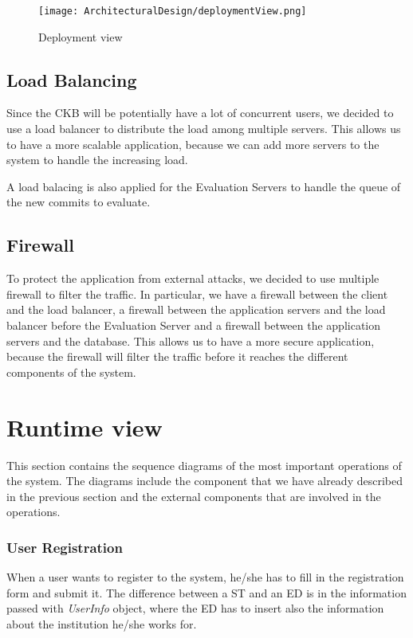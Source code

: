 \begin{figure}[H]
    \label{fig:deployment-view}
    \centering
    \texttt{[image: ArchitecturalDesign/deploymentView.png]}
    \caption{Deployment view}
\end{figure}


\subsection{Load Balancing}
Since the CKB will be potentially have a lot of concurrent users, we decided to use a load balancer to distribute the load among multiple servers. This allows us to have a more scalable application, because we can add more servers to the system to handle the increasing load.

A load balacing is also applied for the Evaluation Servers to handle the queue of the new commits to evaluate.

\subsection{Firewall}
To protect the application from external attacks, we decided to use multiple firewall to filter the traffic. In particular, we have a firewall between the client and the load balancer, a firewall between the application servers and the load balancer before the Evaluation Server and a firewall between the application servers and the database. This allows us to have a more secure application, because the firewall will filter the traffic before it reaches the different components of the system.


\section{Runtime view}
\label{s:runtime-view}%
This section contains the sequence diagrams of the most important operations of the system. The diagrams include the component that we have already described in the previous section and the external components that are involved in the operations.

\subsubsection*{User Registration}
\label{ss:registration_diagram}%
When a user wants to register to the system, he/she has to fill in the registration form and submit it. The difference between a ST and an ED is in the information passed with \textit{UserInfo} object, where the ED has to insert also the information about the institution he/she works for.

